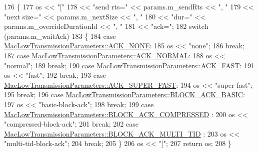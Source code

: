 \begin{DoxyCode}
176 \{
177   os << \textcolor{stringliteral}{"["}
178      << \textcolor{stringliteral}{"send rts="} << params.m\_sendRts << \textcolor{stringliteral}{", "}
179      << \textcolor{stringliteral}{"next size="} << params.m\_nextSize << \textcolor{stringliteral}{", "}
180      << \textcolor{stringliteral}{"dur="} << params.m\_overrideDurationId << \textcolor{stringliteral}{", "}
181      << \textcolor{stringliteral}{"ack="};
182   \textcolor{keywordflow}{switch} (params.m\_waitAck)
183     \{
184     \textcolor{keywordflow}{case} \hyperlink{classns3_1_1MacLowTransmissionParameters_ac3d96f89467a65f56aa791f522c4ffe6a06ddc737bbe3cb7feffe1ec8e75deb6c}{MacLowTransmissionParameters::ACK\_NONE}:
185       os << \textcolor{stringliteral}{"none"};
186       \textcolor{keywordflow}{break};
187     \textcolor{keywordflow}{case} \hyperlink{classns3_1_1MacLowTransmissionParameters_ac3d96f89467a65f56aa791f522c4ffe6a2269d018c5aec2f743b3cf2d362f0149}{MacLowTransmissionParameters::ACK\_NORMAL}:
188       os << \textcolor{stringliteral}{"normal"};
189       \textcolor{keywordflow}{break};
190     \textcolor{keywordflow}{case} \hyperlink{classns3_1_1MacLowTransmissionParameters_ac3d96f89467a65f56aa791f522c4ffe6ad3209156dc043a3797f03bf9c229ad20}{MacLowTransmissionParameters::ACK\_FAST}:
191       os << \textcolor{stringliteral}{"fast"};
192       \textcolor{keywordflow}{break};
193     \textcolor{keywordflow}{case} \hyperlink{classns3_1_1MacLowTransmissionParameters_ac3d96f89467a65f56aa791f522c4ffe6a78271e70ad5a1db9ece908834db073ee}{MacLowTransmissionParameters::ACK\_SUPER\_FAST}:
194       os << \textcolor{stringliteral}{"super-fast"};
195       \textcolor{keywordflow}{break};
196     \textcolor{keywordflow}{case} \hyperlink{classns3_1_1MacLowTransmissionParameters_ac3d96f89467a65f56aa791f522c4ffe6a2c694ce98a212720038515c53c326ca3}{MacLowTransmissionParameters::BLOCK\_ACK\_BASIC}:
197       os << \textcolor{stringliteral}{"basic-block-ack"};
198       \textcolor{keywordflow}{break};
199     \textcolor{keywordflow}{case} \hyperlink{classns3_1_1MacLowTransmissionParameters_ac3d96f89467a65f56aa791f522c4ffe6a277719af63bbc09dcc2b444dd5a9722a}{MacLowTransmissionParameters::BLOCK\_ACK\_COMPRESSED}
      :
200       os << \textcolor{stringliteral}{"compressed-block-ack"};
201       \textcolor{keywordflow}{break};
202     \textcolor{keywordflow}{case} \hyperlink{classns3_1_1MacLowTransmissionParameters_ac3d96f89467a65f56aa791f522c4ffe6acc84d3a325b795df6fc7d95474335814}{MacLowTransmissionParameters::BLOCK\_ACK\_MULTI\_TID}
      :
203       os << \textcolor{stringliteral}{"multi-tid-block-ack"};
204       \textcolor{keywordflow}{break};
205     \}
206   os << \textcolor{stringliteral}{"]"};
207   \textcolor{keywordflow}{return} os;
208 \}
\end{DoxyCode}


